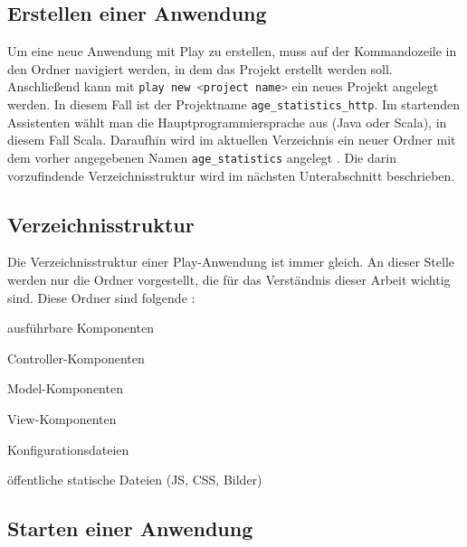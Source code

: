 

\subsection{Erstellen einer Anwendung} %
\label{sub:erstellen_einer_anwendung}

Um eine neue Anwendung mit Play zu erstellen, muss auf der Kommandozeile in den Ordner navigiert werden, in dem das Projekt erstellt werden soll.
Anschließend kann mit \lstinline[language=sh]|play new <project name>| ein neues Projekt angelegt werden.
In diesem Fall ist der Projektname \lstinline|age_statistics_http|.
Im startenden Assistenten wählt man die Hauptprogrammiersprache aus (Java oder Scala), in diesem Fall Scala.
Daraufhin wird im aktuellen Verzeichnis ein neuer Ordner mit dem vorher angegebenen Namen \lstinline|age_statistics| angelegt \cite[vgl.][S.~10]{play_for_scala}.
Die darin vorzufindende Verzeichnisstruktur wird im nächsten Unterabschnitt beschrieben.



\subsection{Verzeichnisstruktur} %
\label{sub:verzeichnisstruktur}

Die Verzeichnisstruktur einer Play-Anwendung ist immer gleich.
An dieser Stelle werden nur die Ordner vorgestellt, die für das Verständnis dieser Arbeit wichtig sind.
Diese Ordner sind folgende \cite[vgl.][]{play_verzeichnisstruktur}:

\begin{description}[leftmargin=!,labelwidth=\widthof{\bfseries app/controllers/}]
  \item[app/] ausführbare Komponenten
  \item[app/controllers/] Controller-Komponenten
  \item[app/models/] Model-Komponenten
  \item[app/views/] View-Komponenten
  \item[conf/] Konfigurationsdateien
  \item[public/] öffentliche statische Dateien (JS, CSS, Bilder)
\end{description}



\subsection{Starten einer Anwendung} %
\label{sub:starten_einer_anwendung}

